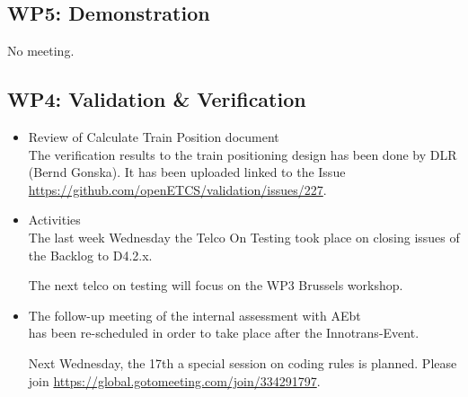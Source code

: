 \documentclass[a4paper, 11pt]{article}
\begin{document}
\subsection{WP5: Demonstration}
No meeting.

\subsection{WP4: Validation \& Verification}
\begin{itemize}
\item Review of Calculate Train Position document\\
The verification results to the train positioning design has been done by DLR (Bernd Gonska). It has been uploaded linked to the Issue \url{https://github.com/openETCS/validation/issues/227}.

\item Activities\\
The last week Wednesday the Telco On Testing took place on closing issues of the Backlog to D4.2.x.

The next telco on testing will focus on the WP3 Brussels workshop.

\item The follow-up meeting of the internal assessment with AEbt\\
has been re-scheduled in order to take place after the Innotrans-Event.

Next Wednesday, the 17th a special session on coding rules is planned. Please join \url{https://global.gotomeeting.com/join/334291797}.

\end{itemize}
\end{document}
